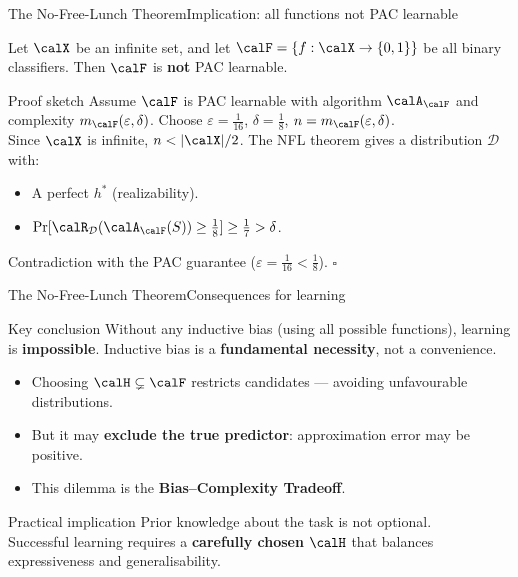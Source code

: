 \begin{frame}{The No-Free-Lunch Theorem}{Implication: all functions not PAC learnable}
  \begin{mytheorem}
    Let $\calX$ be an infinite set, and let $\calF = \{f:\calX\to\{0,1\}\}$ be all binary
    classifiers. Then $\calF$ is \textbf{not} PAC learnable.
  \end{mytheorem}
  \begin{block}{Proof sketch}
    Assume $\calF$ is PAC learnable with algorithm $\calA_\calF$ and complexity
    $m_\calF(\varepsilon,\delta)$. Choose $\varepsilon=\frac{1}{16}$,
    $\delta=\frac{1}{8}$, $n=m_\calF(\varepsilon,\delta)$.\\[4pt]
    Since $\calX$ is infinite, $n < |\calX|/2$. The NFL theorem gives a distribution
    $\mathcal{D}$ with:
    \begin{itemize}
      \item A perfect $h^*$ (realizability).
      \item $\Pr[\calR_\mathcal{D}(\calA_\calF(S)) \geq \frac{1}{8}] \geq \frac{1}{7}
            > \delta$.
    \end{itemize}
    Contradiction with the PAC guarantee ($\varepsilon=\frac{1}{16}<\frac{1}{8}$). $\square$
  \end{block}
\end{frame}

\begin{frame}{The No-Free-Lunch Theorem}{Consequences for learning}
  \begin{alertblock}{Key conclusion}
    Without any inductive bias (using all possible functions), learning is
    \textbf{impossible}. Inductive bias is a \textbf{fundamental necessity}, not a
    convenience.
  \end{alertblock}
  \bigskip
  \begin{itemize}
    \item Choosing $\calH \subsetneq \calF$ restricts candidates — avoiding unfavourable
          distributions.
    \item But it may \textbf{exclude the true predictor}: approximation error may be
          positive.
    \item This dilemma is the \textcolor{AccentBlue}{\textbf{Bias–Complexity Tradeoff}}.
  \end{itemize}
  \bigskip
  \begin{block}{Practical implication}
    Prior knowledge about the task is not optional.\\
    Successful learning requires a \textbf{carefully chosen} $\calH$ that balances
    expressiveness and generalisability.
  \end{block}
\end{frame}

